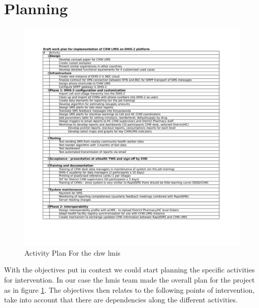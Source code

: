 \section{Planning}
\begin{figure}
\centering
\includegraphics[width=\textwidth]{case/img/lmisWorkPlan}
\caption{Activity Plan For the \gls{chw} \gls{lmis}}
\label{fig:activityPlan}
\end{figure}
With the objectives put in context we could start planning the specific activities for intervention. 
In our case the \gls{hmis} team made the overall plan for the project as in figure \ref{fig:activityPlan}.
The objectives then relates to the following points of intervention, take into account that there are dependencies along the different activities. 
